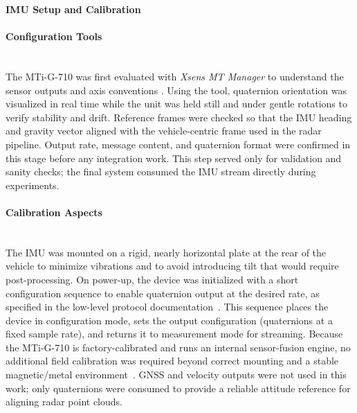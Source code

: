 \newpage
\noindent\textbf{IMU Setup and Calibration}
\label{sec:imu_setup_calibration}

\setcounter{paragraph}{0} %

\paragraph{Configuration Tools}
\hfill
\\
The MTi-G-710 was first evaluated with \textit{Xsens MT Manager} to understand the sensor outputs and axis conventions \cite{xsens_mt_manager_video}.  
Using the tool, quaternion orientation was visualized in real time while the unit was held still and under gentle rotations to verify stability and drift.  
Reference frames were checked so that the IMU heading and gravity vector aligned with the vehicle-centric frame used in the radar pipeline.  
Output rate, message content, and quaternion format were confirmed in this stage before any integration work.  
This step served only for validation and sanity checks; the final system consumed the IMU stream directly during experiments.  
\vspace{0.5em}
\paragraph{Calibration Aspects}
\hfill
\\
The IMU was mounted on a rigid, nearly horizontal plate at the rear of the vehicle to minimize vibrations and to avoid introducing tilt that would require post-processing.  
On power-up, the device was initialized with a short configuration sequence to enable quaternion output at the desired rate, as specified in the low-level protocol documentation~\cite{mti_lowlevel_doc}.  
This sequence places the device in configuration mode, sets the output configuration (quaternions at a fixed sample rate), and returns it to measurement mode for streaming.  
Because the MTi-G-710 is factory-calibrated and runs an internal sensor-fusion engine, no additional field calibration was required beyond correct mounting and a stable magnetic/metal environment~\cite{mti710_manual}.  
GNSS and velocity outputs were not used in this work; only quaternions were consumed to provide a reliable attitude reference for aligning radar point clouds.  
